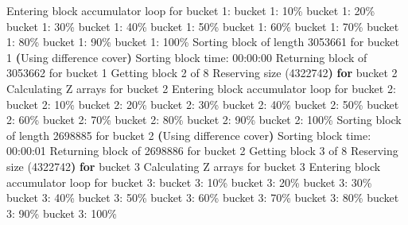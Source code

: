 \documentclass[
  letterpaper,
  DIV=11,
  numbers=noendperiod]{scrartcl}
\newenvironment{Shaded}{\begin{snugshade}}{\end{snugshade}}
\newcommand{\ControlFlowTok}[1]{\textcolor[rgb]{0.00,0.23,0.31}{\textbf{#1}}}
\newcommand{\ErrorTok}[1]{\textcolor[rgb]{0.68,0.00,0.00}{#1}}
\newcommand{\ExtensionTok}[1]{\textcolor[rgb]{0.00,0.23,0.31}{#1}}
\newcommand{\KeywordTok}[1]{\textcolor[rgb]{0.00,0.23,0.31}{\textbf{#1}}}
\newcommand{\NormalTok}[1]{\textcolor[rgb]{0.00,0.23,0.31}{#1}}
\begin{document}
\begin{Shaded}
\begin{Highlighting}[]
  \ExtensionTok{Entering}\NormalTok{ block accumulator loop for bucket 1:}
  \ExtensionTok{bucket}\NormalTok{ 1: 10\%}
  \ExtensionTok{bucket}\NormalTok{ 1: 20\%}
  \ExtensionTok{bucket}\NormalTok{ 1: 30\%}
  \ExtensionTok{bucket}\NormalTok{ 1: 40\%}
  \ExtensionTok{bucket}\NormalTok{ 1: 50\%}
  \ExtensionTok{bucket}\NormalTok{ 1: 60\%}
  \ExtensionTok{bucket}\NormalTok{ 1: 70\%}
  \ExtensionTok{bucket}\NormalTok{ 1: 80\%}
  \ExtensionTok{bucket}\NormalTok{ 1: 90\%}
  \ExtensionTok{bucket}\NormalTok{ 1: 100\%}
  \ExtensionTok{Sorting}\NormalTok{ block of length 3053661 for bucket 1}
  \KeywordTok{(}\ExtensionTok{Using}\NormalTok{ difference cover}\KeywordTok{)}
  \ExtensionTok{Sorting}\NormalTok{ block time: 00:00:00}
\ExtensionTok{Returning}\NormalTok{ block of 3053662 for bucket 1}
\ExtensionTok{Getting}\NormalTok{ block 2 of 8}
  \ExtensionTok{Reserving}\NormalTok{ size }\ErrorTok{(}\ExtensionTok{4322742}\KeywordTok{)} \ControlFlowTok{for}\NormalTok{ bucket }\ExtensionTok{2}
  \ExtensionTok{Calculating}\NormalTok{ Z arrays for bucket 2}
  \ExtensionTok{Entering}\NormalTok{ block accumulator loop for bucket 2:}
  \ExtensionTok{bucket}\NormalTok{ 2: 10\%}
  \ExtensionTok{bucket}\NormalTok{ 2: 20\%}
  \ExtensionTok{bucket}\NormalTok{ 2: 30\%}
  \ExtensionTok{bucket}\NormalTok{ 2: 40\%}
  \ExtensionTok{bucket}\NormalTok{ 2: 50\%}
  \ExtensionTok{bucket}\NormalTok{ 2: 60\%}
  \ExtensionTok{bucket}\NormalTok{ 2: 70\%}
  \ExtensionTok{bucket}\NormalTok{ 2: 80\%}
  \ExtensionTok{bucket}\NormalTok{ 2: 90\%}
  \ExtensionTok{bucket}\NormalTok{ 2: 100\%}
  \ExtensionTok{Sorting}\NormalTok{ block of length 2698885 for bucket 2}
  \KeywordTok{(}\ExtensionTok{Using}\NormalTok{ difference cover}\KeywordTok{)}
  \ExtensionTok{Sorting}\NormalTok{ block time: 00:00:01}
\ExtensionTok{Returning}\NormalTok{ block of 2698886 for bucket 2}
\ExtensionTok{Getting}\NormalTok{ block 3 of 8}
  \ExtensionTok{Reserving}\NormalTok{ size }\ErrorTok{(}\ExtensionTok{4322742}\KeywordTok{)} \ControlFlowTok{for}\NormalTok{ bucket }\ExtensionTok{3}
  \ExtensionTok{Calculating}\NormalTok{ Z arrays for bucket 3}
  \ExtensionTok{Entering}\NormalTok{ block accumulator loop for bucket 3:}
  \ExtensionTok{bucket}\NormalTok{ 3: 10\%}
  \ExtensionTok{bucket}\NormalTok{ 3: 20\%}
  \ExtensionTok{bucket}\NormalTok{ 3: 30\%}
  \ExtensionTok{bucket}\NormalTok{ 3: 40\%}
  \ExtensionTok{bucket}\NormalTok{ 3: 50\%}
  \ExtensionTok{bucket}\NormalTok{ 3: 60\%}
  \ExtensionTok{bucket}\NormalTok{ 3: 70\%}
  \ExtensionTok{bucket}\NormalTok{ 3: 80\%}
  \ExtensionTok{bucket}\NormalTok{ 3: 90\%}
  \ExtensionTok{bucket}\NormalTok{ 3: 100\%}

\end{Highlighting}
\end{Shaded}
\end{document}
